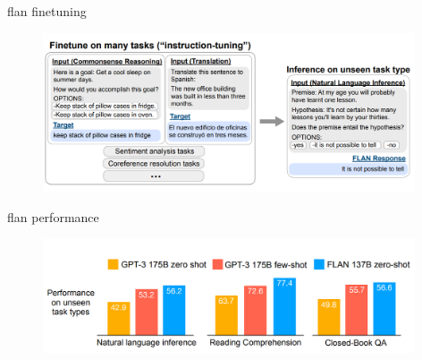 \begin{frame}{flan finetuning}

\vfill
	
	\begin{figure}
		\centering
		\includegraphics[width = 11cm]{figure/81-flan-instruct-tune.png}\\ 
	\end{figure}

\vfill

\end{frame}


\begin{frame}{flan performance}

\vfill
	
	\begin{figure}
		\centering
		\includegraphics[width = 11cm]{figure/81-flan-perf.png}\\ 
	\end{figure}

\vfill

\end{frame}


